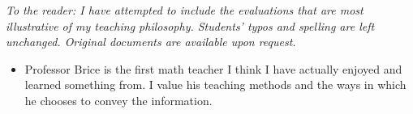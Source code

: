 \documentclass[11pt]{article}
\begin{document}

\makeletterhead

\maketitle

\vfill

\emph{To the reader: I have attempted to include the evaluations that
are most illustrative of my teaching philosophy. Students' typos and
spelling are left unchanged. Original documents are available upon
request.}

	\begin{itemize}

		\item{}
      Professor Brice is the first math teacher I think I have actually
      enjoyed and learned something from.
      I value his teaching methods and the ways in which he chooses to
      convey the information.
	\end{itemize}
\end{document}
